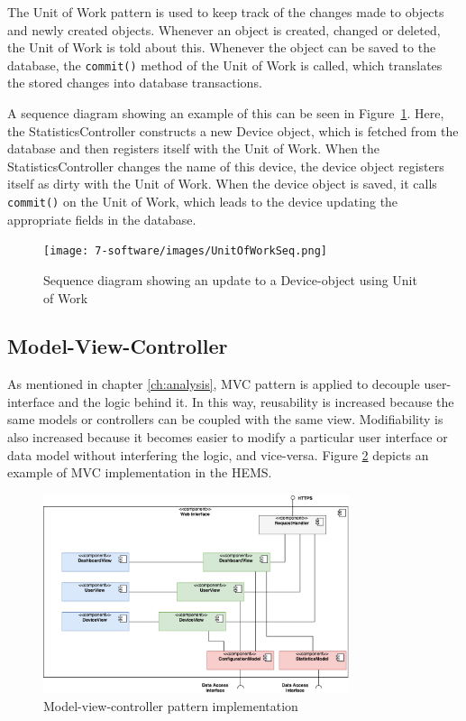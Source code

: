 The Unit of Work pattern is used to keep track of the changes made to objects and newly created objects. Whenever an object is created, changed or deleted, the Unit of Work is told about this. 
Whenever the object can be saved to the database, the \verb|commit()| method of the Unit of Work is called, which translates the stored changes into database transactions.

A sequence diagram showing an example of this can be seen in Figure~\ref{fig:unitofworkseq}. Here, the StatisticsController constructs a new Device object, which is fetched from the database and then registers itself with the Unit of Work. When the StatisticsController changes the name of this device, the device object registers itself as dirty with the Unit of Work. 
When the device object is saved, it calls \verb|commit()| on the Unit of Work, which leads to the device updating the appropriate fields in the database.


\begin{figure}[H]
\centering
\texttt{[image: 7-software/images/UnitOfWorkSeq.png]}
\caption{Sequence diagram showing an update to a Device-object using Unit of Work}
\label{fig:unitofworkseq}
\end{figure}



\clearpage
\subsection{Model-View-Controller}
\label{sec:mvc}
As mentioned in chapter \ref{ch:analysis}, MVC pattern is applied to decouple user-interface and the logic behind it. In this way, reusability is increased because the same models or controllers can be coupled with the same view. Modifiability is also increased because it becomes easier to modify a particular user interface or data model without interfering the logic, and vice-versa. Figure \ref{fig:mvc-architecture} depicts an example of MVC implementation in the HEMS.

\begin{figure}[H]
	\centering
	\includegraphics[width=0.8\textwidth]{7-software/images/mvc.pdf}
	\caption{Model-view-controller pattern implementation}
	\label{fig:mvc-architecture}
\end{figure}

